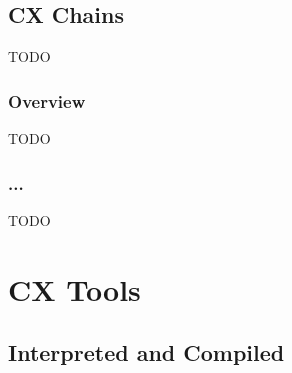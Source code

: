 \documentclass[11pt,fleqn,openany]{book} %
\begin{document}
\chapter{CX Chains}
\label{chapter:cx-chains}

TODO

\section{Overview}

TODO

\section{...}

TODO


\part{CX Tools}


\chapter{Interpreted and Compiled}
\label{chapter:interpreted-and-compiled}
\end{document}
